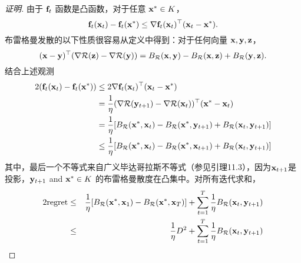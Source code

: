 \begin{proof}[证明]
由于 $\fv$ 函数是凸函数，对于任意 $\x^* \in K$，
$$ \fv(\x_t) - \fv(\x^*) \leq \nabla \fv(\x_t)^\top (\x_t - \x^*)  .$$
布雷格曼发散的以下性质很容易从定义中得到：对于任何向量 $\x,\y,\z$，
$$ (\x - \y)^\top (\nabla \R(\z) - \nabla \R(\y)) = B_\R(\x,\y)-B_\R(\x,\z) +
B_\R(\y,\z). $$
结合上述观测
\begin{align*}
2(\fv(\x_t) - \fv(\x^*)) & \leq 2\nabla \fv(\x_t)^\top (\x_t - \x^*)  \\
& =   \frac{1}{\eta}  (\nabla \R(\y_{t+1}) - \nabla \R(\x_{t}))^\top(\x^* - \x_t) \\
& =  \frac{1}{\eta} [B_\R(\x^*,\xv)-B_\R(\x^*,\y_{t+1}) + B_\R(\x_t,\y_{t+1})]   \\
& \leq  \frac{1}{\eta} [B_\R(\x^*,\xv)-B_\R(\x^*,\x_{t+1}) +
B_\R(\x_t,\y_{t+1})]
\end{align*}
其中，最后一个不等式来自广义毕达哥拉斯不等式（参见\cite{CesaBianchiLugosi06book}引理11.3），因为$\x_{t+1}$是投影，$\y_{t+1}$ and $\x^* \in K$ 的布雷格曼散度在凸集中。对所有迭代求和，
\begin{eqnarray} \label{eq:general1}
2\regret & \leq & \frac{1}{\eta} [ B_\R(\x^*,\x_1) -  B_\R(\x^*,\x_T) ] + \sum_{t=1}^T \frac{1}{\eta} B_\R(\x_t,\y_{t+1}) \notag \\
& \leq & \frac{1}{\eta} D^2  + \sum_{t=1}^T \frac{1}{\eta} B_\R(\x_t,\y_{t+1})
\end{eqnarray}


\end{proof}
